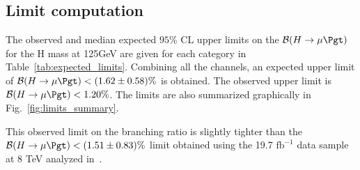\subsection{Limit computation}

The observed and median expected $95\%$ CL upper limits on the $\mathcal{B}(H \rightarrow \mu \Pgt )$ for the H mass at 125GeV are given for each category
in Table~\ref{tab:expected_limits}.  Combining all
the channels, an expected upper limit of $\mathcal{B}(H \rightarrow \mu \Pgt )<(1.62 \pm 0.58)\%$ is obtained.
The observed upper limit is $\mathcal{B}(H \rightarrow \mu \Pgt ) < 1.20\%$.
The limits are also  summarized graphically  in
Fig.~\ref{fig:limits_summary}.

This observed limit on the branching ratio is slightly tighter than the $\mathcal{B}(H \rightarrow \mu \Pgt )<(1.51 \pm 0.83)\%$ limit obtained using the 19.7 $\textrm{fb}^{-1}$ data sample at 8 TeV analyzed in~\cite{Khachatryan:2015kon}.


